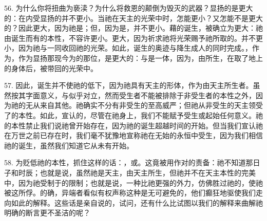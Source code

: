 56. 为什么你将扭曲为亵渎？为什么将救恩的颠倒为毁灭的武器？显扬的是更大的：在内受显扬的并不更小。当祂在天主的光荣中时，怎能更小？又怎能不是更大的？因此更大，因为祂是；但，因为是，并不更小。藉的诞生，被确立为更大：祂由诞生而有的本性，不容许更小。更大，因为祈求祂将光荣赐予祂所取的。并不更小，因为祂与一同收回祂的光荣。如此，诞生的奥迹与降生成人的同时完成。，作为，作为显扬那现今为的那位，是更大的：与是一体，因为，由所生，在取了地上的身体后，被带回的光荣中。\par

57. 因此，诞生并不使祂的低下，因为祂具有天主的形体，作为由天主所生者。虽然按其字面意义，与似乎对立，然而受生者不能被排除于非受生者的本性之外，因为祂的无从来自其他。祂确实不分有非受生的至高威严；但祂从非受生的天主领受了的本性。如此，宣认的，尽管在祂身上，我们不能赋予受生或起始任何意义。祂的本性禁止我们说祂曾开始存在，因为祂的诞生超越时间的开始。但当我们宣认祂在万世之前已存在时，我们毫不犹豫地宣称祂在无始的永恒中受生，因为我们相信祂的诞生，虽然我们知道它从未有开始。\par

58. 为贬低祂的本性，抓住这样的话：，或。这竟被用作对的责备：祂不知道那日子和时辰；也就是说，虽然祂是天主，由天主所生，但祂并不在天主本性的完美中，因为祂受制于的限制；也就是说，一种比祂更强的外力，仿佛胜过祂的，使祂被这所俘。的确，异端者看似有权声称这种是无可避免的，他们癫狂地驱使我们走向如此的解释。这些话是亲自说的，试问，还有什么比试图以我们的解释来曲解祂明确的断言更不圣洁的呢？\par

